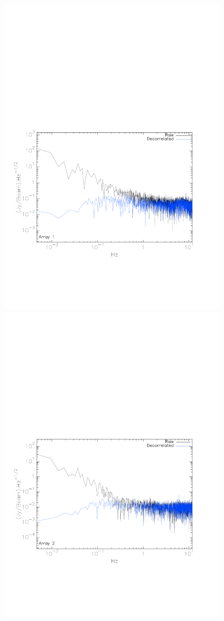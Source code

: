 \documentclass[]{aa} %
\begin{document}
\begin{figure}[h]
   \centering
    \includegraphics[trim=1cm 4cm 2cm 12cm, clip=true,width=0.85\linewidth]{A1_noise_spec.pdf}     
       \includegraphics[trim=1cm 4cm 2cm 12cm, clip=true,width=0.85\linewidth]{A2_noise_spec.pdf}     

\end{figure}
\end{document}

